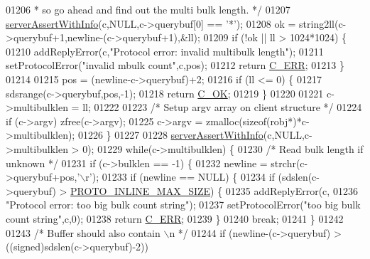 \begin{DoxyCode}
{{{{{{{{{{{{{{01206 \textcolor{comment}{         * so go ahead and find out the multi bulk length. */}
01207         \hyperlink{server_8h_a7308f76cbff9a8d3797fe78190b91282}{serverAssertWithInfo}(c,NULL,c->querybuf[0] == \textcolor{stringliteral}{'*'});
01208         ok = string2ll(c->querybuf+1,newline-(c->querybuf+1),&ll);
01209         \textcolor{keywordflow}{if} (!ok || ll > 1024*1024) \{
01210             addReplyError(c,\textcolor{stringliteral}{"Protocol error: invalid multibulk length"});
01211             setProtocolError(\textcolor{stringliteral}{"invalid mbulk count"},c,pos);
01212             \textcolor{keywordflow}{return} \hyperlink{server_8h_af98ac28d5f4d23d7ed5985188e6fb7d1}{C\_ERR};
01213         \}
01214 
01215         pos = (newline-c->querybuf)+2;
01216         \textcolor{keywordflow}{if} (ll <= 0) \{
01217             sdsrange(c->querybuf,pos,-1);
01218             \textcolor{keywordflow}{return} \hyperlink{server_8h_a303769ef1065076e68731584e758d3e1}{C\_OK};
01219         \}
01220 
01221         c->multibulklen = ll;
01222 
01223         \textcolor{comment}{/* Setup argv array on client structure */}
01224         \textcolor{keywordflow}{if} (c->argv) zfree(c->argv);
01225         c->argv = zmalloc(\textcolor{keyword}{sizeof}(robj*)*c->multibulklen);
01226     \}
01227 
01228     \hyperlink{server_8h_a7308f76cbff9a8d3797fe78190b91282}{serverAssertWithInfo}(c,NULL,c->multibulklen > 0);
01229     \textcolor{keywordflow}{while}(c->multibulklen) \{
01230         \textcolor{comment}{/* Read bulk length if unknown */}
01231         \textcolor{keywordflow}{if} (c->bulklen == -1) \{
01232             newline = strchr(c->querybuf+pos,\textcolor{stringliteral}{'\(\backslash\)r'});
01233             \textcolor{keywordflow}{if} (newline == NULL) \{
01234                 \textcolor{keywordflow}{if} (sdslen(c->querybuf) > \hyperlink{server_8h_a8214e9e04b3a27e8e38d35cda0f55874}{PROTO\_INLINE\_MAX\_SIZE}) \{
01235                     addReplyError(c,
01236                         \textcolor{stringliteral}{"Protocol error: too big bulk count string"});
01237                     setProtocolError(\textcolor{stringliteral}{"too big bulk count string"},c,0);
01238                     \textcolor{keywordflow}{return} \hyperlink{server_8h_af98ac28d5f4d23d7ed5985188e6fb7d1}{C\_ERR};
01239                 \}
01240                 \textcolor{keywordflow}{break};
01241             \}
01242 
01243             \textcolor{comment}{/* Buffer should also contain \(\backslash\)n */}
01244             \textcolor{keywordflow}{if} (newline-(c->querybuf) > ((\textcolor{keywordtype}{signed})sdslen(c->querybuf)-2))
}}}}}}}}}}}}}}
\end{DoxyCode}
